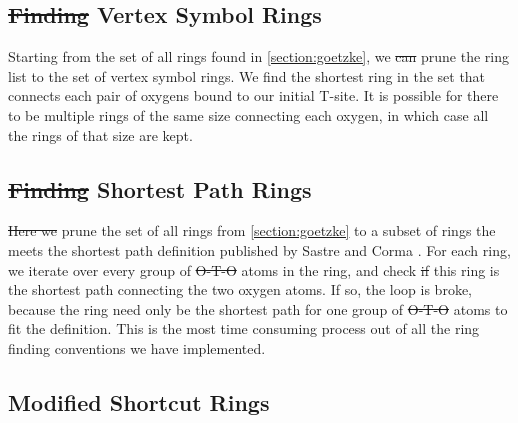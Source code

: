 \documentclass[preprint,numrefs,noinfo,sort&compress]{elsarticle}
\providecommand{\DIFadd}[1]{{\protect\color{blue}\uwave{#1}}} %
\providecommand{\DIFdel}[1]{{\protect\color{red}\sout{#1}}}                      %
\providecommand{\DIFaddbegin}{} %
\providecommand{\DIFaddend}{} %
\providecommand{\DIFdelbegin}{} %
\providecommand{\DIFdelend}{} %
\newcommand{\DIFscaledelfig}{0.5}
\newlength{\DIFdelgraphicswidth} %
\newlength{\DIFdelgraphicsheight} %
\newcommand{\DIFaddincludegraphics}[2][]{{\color{blue}\fbox{\DIFOincludegraphics[#1]{#2}}}} %
\newcommand{\DIFdelincludegraphics}[2][]{%
\sbox{\DIFdelgraphicsbox}{\DIFOincludegraphics[#1]{#2}}%
\settoboxwidth{\DIFdelgraphicswidth}{\DIFdelgraphicsbox} %
\settoboxtotalheight{\DIFdelgraphicsheight}{\DIFdelgraphicsbox} %
\scalebox{\DIFscaledelfig}{%
\parbox[b]{\DIFdelgraphicswidth}{\usebox{\DIFdelgraphicsbox}\\[-\baselineskip] \rule{\DIFdelgraphicswidth}{0em}}\llap{\resizebox{\DIFdelgraphicswidth}{\DIFdelgraphicsheight}{%
\setlength{\unitlength}{\DIFdelgraphicswidth}%
\begin{picture}(1,1)%
\thicklines\linethickness{2pt} %
{\color[rgb]{1,0,0}\put(0,0){\framebox(1,1){}}}%
{\color[rgb]{1,0,0}\put(0,0){\line( 1,1){1}}}%
{\color[rgb]{1,0,0}\put(0,1){\line(1,-1){1}}}%
\end{picture}%
}\hspace*{3pt}}} %
} %
\DeclareRobustCommand{\DIFaddbegin}{\DIFOaddbegin \let\includegraphics\DIFaddincludegraphics} %
\DeclareRobustCommand{\DIFaddend}{\DIFOaddend \let\includegraphics\DIFOincludegraphics} %
\DeclareRobustCommand{\DIFdelbegin}{\DIFOdelbegin \let\includegraphics\DIFdelincludegraphics} %
\DeclareRobustCommand{\DIFdelend}{\DIFOaddend \let\includegraphics\DIFOincludegraphics} %
\begin{document}
\subsection{\DIFdelbegin \DIFdel{Finding }\DIFdelend Vertex Symbol Rings \label{section:vertex}}
\DIFdelbegin %
\DIFdelend \DIFaddbegin \label{sec:org415adcd}
\DIFaddend 

Starting from the set of all rings found in \cref{section:goetzke}, we \DIFdelbegin \DIFdel{can }\DIFdelend prune the ring list to the set of vertex symbol rings. We find the shortest ring in the set that connects each pair of oxygens bound to our initial T-site. It is possible for there to be multiple rings of the same size connecting each oxygen, in which case all the rings of that size are kept. 

\subsection{\DIFdelbegin \DIFdel{Finding }\DIFdelend Shortest Path Rings}
\DIFdelbegin %
\DIFdelend \DIFaddbegin \label{sec:org6be3a64}
\DIFaddend 

\DIFdelbegin \DIFdel{Here we }\DIFdelend \DIFaddbegin \DIFadd{We }\DIFaddend prune the set of all rings from \cref{section:goetzke} to a subset of rings the meets the shortest path definition published by Sastre and Corma \cite{sastre-topological-2009}. For each ring, we iterate over every group of \DIFdelbegin \DIFdel{O-T-O }\DIFdelend \DIFaddbegin \DIFadd{\ce{O-T-O} }\DIFaddend atoms in the ring, and check \DIFdelbegin \DIFdel{if }\DIFdelend \DIFaddbegin \DIFadd{whether }\DIFaddend this ring is the shortest path connecting the two oxygen atoms. If so, the loop is broke, because the ring need only be the shortest path for one group of \DIFdelbegin \DIFdel{O-T-O }\DIFdelend \DIFaddbegin \DIFadd{\ce{O-T-O} }\DIFaddend atoms to fit the definition. This is the most time consuming process out of all the ring finding conventions we have implemented.

\subsection{Modified Shortcut Rings \DIFaddbegin \label{section:modified}\DIFaddend }
\DIFdelbegin %
\end{document}
